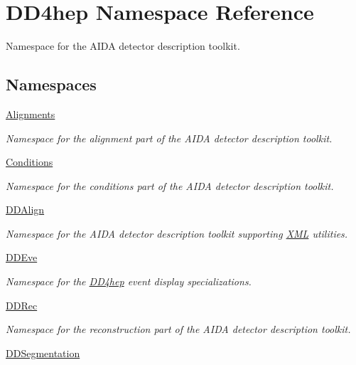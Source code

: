 \hypertarget{namespace_d_d4hep}{}\section{D\+D4hep Namespace Reference}
\label{namespace_d_d4hep}


Namespace for the A\+I\+DA detector description toolkit.  


\subsection*{Namespaces}
\begin{DoxyCompactItemize}
\item 
 \hyperlink{namespace_d_d4hep_1_1_alignments}{Alignments}
\begin{DoxyCompactList}\small\item\em Namespace for the alignment part of the A\+I\+DA detector description toolkit. \end{DoxyCompactList}\item 
 \hyperlink{namespace_d_d4hep_1_1_conditions}{Conditions}
\begin{DoxyCompactList}\small\item\em Namespace for the conditions part of the A\+I\+DA detector description toolkit. \end{DoxyCompactList}\item 
 \hyperlink{namespace_d_d4hep_1_1_d_d_align}{D\+D\+Align}
\begin{DoxyCompactList}\small\item\em Namespace for the A\+I\+DA detector description toolkit supporting \hyperlink{namespace_d_d4hep_1_1_x_m_l}{X\+ML} utilities. \end{DoxyCompactList}\item 
 \hyperlink{namespace_d_d4hep_1_1_d_d_eve}{D\+D\+Eve}
\begin{DoxyCompactList}\small\item\em Namespace for the \hyperlink{namespace_d_d4hep}{D\+D4hep} event display specializations. \end{DoxyCompactList}\item 
 \hyperlink{namespace_d_d4hep_1_1_d_d_rec}{D\+D\+Rec}
\begin{DoxyCompactList}\small\item\em Namespace for the reconstruction part of the A\+I\+DA detector description toolkit. \end{DoxyCompactList}\item 
 \hyperlink{namespace_d_d4hep_1_1_d_d_segmentation}{D\+D\+Segmentation}

\end{DoxyCompactItemize}
